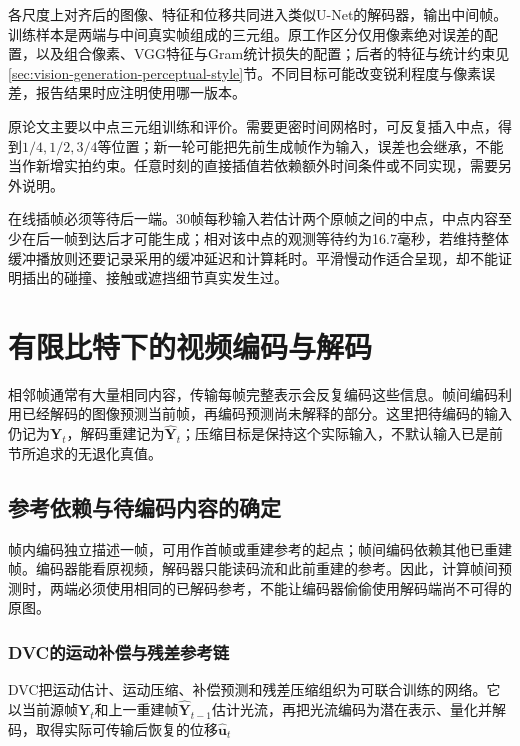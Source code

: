 各尺度上对齐后的图像、特征和位移共同进入类似U-Net的解码器，输出中间帧。训练样本是两端与中间真实帧组成的三元组。原工作区分仅用像素绝对误差的配置，以及组合像素、VGG特征与Gram统计损失的配置；后者的特征与统计约束见\ref{sec:vision-generation-perceptual-style}节。不同目标可能改变锐利程度与像素误差，报告结果时应注明使用哪一版本。

原论文主要以中点三元组训练和评价。需要更密时间网格时，可反复插入中点，得到$1/4,1/2,3/4$等位置；新一轮可能把先前生成帧作为输入，误差也会继承，不能当作新增实拍约束。任意时刻的直接插值若依赖额外时间条件或不同实现，需要另外说明。

在线插帧必须等待后一端。30帧每秒输入若估计两个原帧之间的中点，中点内容至少在后一帧到达后才可能生成；相对该中点的观测等待约为16.7毫秒，若维持整体缓冲播放则还要记录采用的缓冲延迟和计算耗时。平滑慢动作适合呈现，却不能证明插出的碰撞、接触或遮挡细节真实发生过。

\section{有限比特下的视频编码与解码}
\label{sec:vision-video-codec}

相邻帧通常有大量相同内容，传输每帧完整表示会反复编码这些信息。帧间编码利用已经解码的图像预测当前帧，再编码预测尚未解释的部分。这里把待编码的输入仍记为$\bm{Y}_t$，解码重建记为$\widehat{\bm{Y}}_t$；压缩目标是保持这个实际输入，不默认输入已是前节所追求的无退化真值。

\subsection{参考依赖与待编码内容的确定}
\label{sec:vision-video-codec-reference}

帧内编码独立描述一帧，可用作首帧或重建参考的起点；帧间编码依赖其他已重建帧。编码器能看原视频，解码器只能读码流和此前重建的参考。因此，计算帧间预测时，两端必须使用相同的已解码参考，不能让编码器偷偷使用解码端尚不可得的原图。

\subsubsection{DVC的运动补偿与残差参考链}
\label{sec:vision-video-dvc}

DVC把运动估计、运动压缩、补偿预测和残差压缩组织为可联合训练的网络。它以当前源帧$\bm{Y}_t$和上一重建帧$\widehat{\bm{Y}}_{t-1}$估计光流，再把光流编码为潜在表示、量化并解码，取得实际可传输后恢复的位移$\widehat{\bm{u}}_t$

